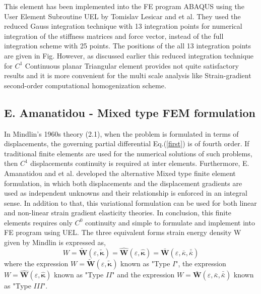 \documentclass[12pt]{article}
\begin{document}
\newline
This element has been implemented into the FE program ABAQUS using the User Element Subroutine UEL by Tomislav Lesicar and et al. They used the reduced Gauss integration
technique with 13 integration points for numerical integration of the stiffness matrices and force vector, instead of the full integration scheme with 25 points. The positions of the all 13 integration points are given in Fig. However, as discussed earlier this reduced integration technique for $C^1$ Continuous planar Triangular element provides not quite satisfactory results and it is more convenient for the multi scale analysis like Strain-gradient second-order computational homogenization scheme.     

\subsection{E. Amanatidou - Mixed type FEM formulation}
In Mindlin's 1960s theory (2.1), when the problem is formulated in terms of displacements, the governing partial differential Eq.(\ref{first}) is of fourth order. If traditional finite elements are used for the numerical solutions of such problems, then $C^1$ displacements continuity is required at inter elements.
\newline
\newline
Furthermore, E. Amanatidou and et al. developed the alternative Mixed type finite element formulation, in which both displacements and the displacement gradients are used as independent unknowns and their relationship is enforced in an integral sense. In addition to that, this variational formulation can be used for both linear and non-linear strain gradient elasticity theories. In conclusion, this finite elements requires only $C^0$ continuity and simple to formulate and implement into FE program using UEL.   
\newline
\newline
The three equivalent forms strain energy density W given by Mindlin is expressed as,
\begin{equation}
W = \tilde{\mathbf{W}}(\varepsilon,\tilde{\mathbf{\kappa}}) = \hat{\mathbf{W}}(\varepsilon,\hat{\mathbf{\kappa}}) = \bar{\mathbf{W}}(\varepsilon,\bar{\kappa},\bar{\bar \kappa})
\end{equation}
where the expression $W = \tilde{\mathbf{W}}(\varepsilon,\tilde{\mathbf{\kappa}})$ known as "Type $I$", the expression $W =\hat{\mathbf{W}}(\varepsilon,\hat{\mathbf{\kappa}}) $ known as "Type $II$" and the expression $W = \bar{\mathbf{W}}(\varepsilon,\bar{\kappa},\bar{\bar \kappa}) $ known as "Type $III$".
\end{document}
